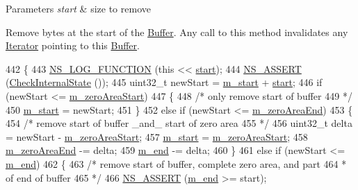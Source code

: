 \begin{DoxyParams}{Parameters}
{\em start} & size to remove\\
\hline
\end{DoxyParams}
Remove bytes at the start of the \hyperlink{classns3_1_1Buffer}{Buffer}. Any call to this method invalidates any \hyperlink{classns3_1_1Buffer_1_1Iterator}{Iterator} pointing to this \hyperlink{classns3_1_1Buffer}{Buffer}. 
\begin{DoxyCode}
442 \{
443   \hyperlink{log-macros-disabled_8h_a90b90d5bad1f39cb1b64923ea94c0761}{NS\_LOG\_FUNCTION} (\textcolor{keyword}{this} << \hyperlink{namespacevisualizer_1_1core_a2a35e5d8a34af358b508dac8635754e0}{start});
444   \hyperlink{assert_8h_a6dccdb0de9b252f60088ce281c49d052}{NS\_ASSERT} (\hyperlink{classns3_1_1Buffer_a6202ce7f1ecc1fc7a14cc13017375d14}{CheckInternalState} ());
445   uint32\_t newStart = \hyperlink{classns3_1_1Buffer_afbea962435250b6a0a6c860c50b75386}{m\_start} + \hyperlink{namespacevisualizer_1_1core_a2a35e5d8a34af358b508dac8635754e0}{start};
446   \textcolor{keywordflow}{if} (newStart <= \hyperlink{classns3_1_1Buffer_ae2ebe054c3e7e2ecdfd7fcb318bf085c}{m\_zeroAreaStart})
447     \{
448       \textcolor{comment}{/* only remove start of buffer }
449 \textcolor{comment}{       */}
450       \hyperlink{classns3_1_1Buffer_afbea962435250b6a0a6c860c50b75386}{m\_start} = newStart;
451     \}
452   \textcolor{keywordflow}{else} \textcolor{keywordflow}{if} (newStart <= \hyperlink{classns3_1_1Buffer_a50eb9a6ce5a2a75c25718edb92b8fdc0}{m\_zeroAreaEnd})
453     \{
454       \textcolor{comment}{/* remove start of buffer \_and\_ start of zero area}
455 \textcolor{comment}{       */}
456       uint32\_t delta = newStart - \hyperlink{classns3_1_1Buffer_ae2ebe054c3e7e2ecdfd7fcb318bf085c}{m\_zeroAreaStart};
457       \hyperlink{classns3_1_1Buffer_afbea962435250b6a0a6c860c50b75386}{m\_start} = \hyperlink{classns3_1_1Buffer_ae2ebe054c3e7e2ecdfd7fcb318bf085c}{m\_zeroAreaStart};
458       \hyperlink{classns3_1_1Buffer_a50eb9a6ce5a2a75c25718edb92b8fdc0}{m\_zeroAreaEnd} -= delta;
459       \hyperlink{classns3_1_1Buffer_a1f83bdf72c64ddd2a2e862b64236f29d}{m\_end} -= delta;
460     \} 
461   \textcolor{keywordflow}{else} \textcolor{keywordflow}{if} (newStart <= \hyperlink{classns3_1_1Buffer_a1f83bdf72c64ddd2a2e862b64236f29d}{m\_end})
462     \{
463       \textcolor{comment}{/* remove start of buffer, complete zero area, and part}
464 \textcolor{comment}{       * of end of buffer }
465 \textcolor{comment}{       */}
466       \hyperlink{assert_8h_a6dccdb0de9b252f60088ce281c49d052}{NS\_ASSERT} (\hyperlink{classns3_1_1Buffer_a1f83bdf72c64ddd2a2e862b64236f29d}{m\_end} >= start);

\end{DoxyCode}
